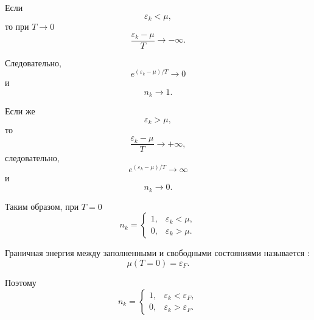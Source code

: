 \documentclass[../final.tex]{subfiles}
\begin{document}
Если
%
\begin{equation*}
    \varepsilon_k<\mu,
\end{equation*}
%
то при $T\to0$
%
\begin{equation*}
    \frac{
        \varepsilon_k-\mu
    }{
        T
    }
    \to
    -\infty.
\end{equation*}

Следовательно,
%
\begin{equation*}
    e^{(\varepsilon_k-\mu)/T}
    \to
    0
\end{equation*}
%
и
%
\begin{equation*}
    n_k
    \to
    1.
\end{equation*}

Если же
%
\begin{equation*}
    \varepsilon_k>\mu,
\end{equation*}
%
то
%
\begin{equation*}
    \frac{
        \varepsilon_k-\mu
    }{
        T
    }
    \to
    +\infty,
\end{equation*}
%
следовательно,
%
\begin{equation*}
    e^{(\varepsilon_k-\mu)/T}
    \to
    \infty
\end{equation*}
%
и
%
\begin{equation*}
    n_k
    \to
    0.
\end{equation*}

Таким образом, при $T=0$
%
\begin{equation*}
    n_k
    =
    \begin{cases}
        1,
        &
        \varepsilon_k<\mu,
        \\[4pt]
        0,
        &
        \varepsilon_k>\mu.
    \end{cases}
\end{equation*}

Граничная энергия между заполненными и свободными состояниями
называется :
%
\begin{equation*}
    \mu(T=0)
    =
    \varepsilon_F.
\end{equation*}

Поэтому
%
\begin{equation*}
    n_k
    =
    \begin{cases}
        1,
        &
        \varepsilon_k<\varepsilon_F,
        \\[4pt]
        0,
        &
        \varepsilon_k>\varepsilon_F.
    \end{cases}
\end{equation*}
\end{document}
